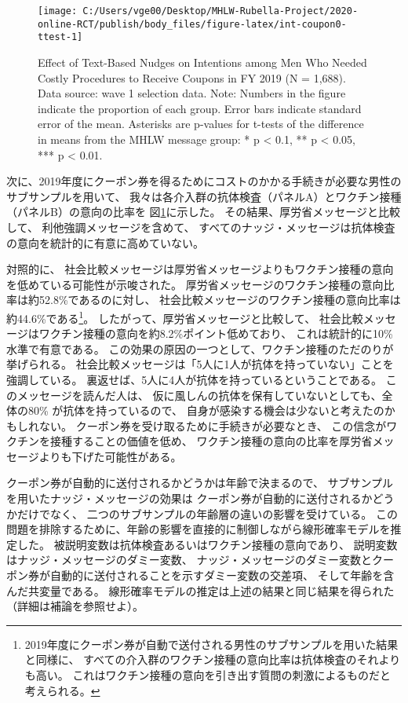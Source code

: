 \documentclass[
  11pt,
  a4paper,
]{article}
\begin{document}
\begin{figure}[t]
\texttt{[image: C:/Users/vge00/Desktop/MHLW-Rubella-Project/2020-online-RCT/publish/body\_files/figure-latex/int-coupon0-ttest-1]} \caption{Effect of Text-Based Nudges on Intentions among Men Who Needed Costly Procedures to Receive Coupons in FY 2019 (N = 1,688). Data source: wave 1 selection data. Note: Numbers in the figure indicate the proportion of each group. Error bars indicate standard error of the mean. Asterisks are p-values for t-tests of the difference in means from the MHLW message group: * p < 0.1, ** p < 0.05, *** p < 0.01.}\label{fig:int-coupon0-ttest}
\end{figure}

次に、2019年度にクーポン券を得るためにコストのかかる手続きが必要な男性のサブサンプルを用いて、
我々は各介入群の抗体検査（パネルA）とワクチン接種（パネルB）の意向の比率を
図\ref{fig:int-coupon0-ttest}に示した。
その結果、厚労省メッセージと比較して、
利他強調メッセージを含めて、
すべてのナッジ・メッセージは抗体検査の意向を統計的に有意に高めていない。

対照的に、
社会比較メッセージは厚労省メッセージよりもワクチン接種の意向を低めている可能性が示唆された。
厚労省メッセージのワクチン接種の意向比率は約52.8\%であるのに対し、
社会比較メッセージのワクチン接種の意向比率は約44.6\%である\footnote{2019年度にクーポン券が自動で送付される男性のサブサンプルを用いた結果と同様に、
  すべての介入群のワクチン接種の意向比率は抗体検査のそれよりも高い。
  これはワクチン接種の意向を引き出す質問の刺激によるものだと考えられる。}。
したがって、厚労省メッセージと比較して、
社会比較メッセージはワクチン接種の意向を約8.2\%ポイント低めており、
これは統計的に10\%水準で有意である。
この効果の原因の一つとして、ワクチン接種のただのりが挙げられる。
社会比較メッセージは「5人に1人が抗体を持っていない」ことを強調している。
裏返せば、5人に4人が抗体を持っているということである。
このメッセージを読んだ人は、
仮に風しんの抗体を保有していないとしても、全体の80\% が抗体を持っているので、
自身が感染する機会は少ないと考えたのかもしれない。
クーポン券を受け取るために手続きが必要なとき、
この信念がワクチンを接種することの価値を低め、
ワクチン接種の意向の比率を厚労省メッセージよりも下げた可能性がある。

クーポン券が自動的に送付されるかどうかは年齢で決まるので、
サブサンプルを用いたナッジ・メッセージの効果は
クーポン券が自動的に送付されるかどうかだけでなく、
二つのサブサンプルの年齢層の違いの影響を受けている。
この問題を排除するために、年齢の影響を直接的に制御しながら線形確率モデルを推定した。
被説明変数は抗体検査あるいはワクチン接種の意向であり、
説明変数はナッジ・メッセージのダミー変数、
ナッジ・メッセージのダミー変数とクーポン券が自動的に送付されることを示すダミー変数の交差項、
そして年齢を含んだ共変量である。
線形確率モデルの推定は上述の結果と同じ結果を得られた（詳細は補論を参照せよ）。
\end{document}
